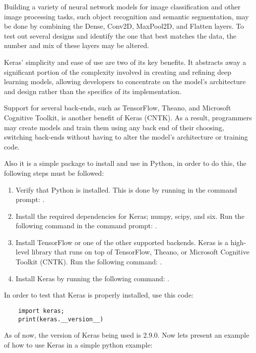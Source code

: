 Building a variety of neural network models for image classification and other image processing tasks, such object recognition and semantic segmentation, may be done by combining the Dense, Conv2D, MaxPool2D, and Flatten layers. To test out several designs and identify the one that best matches the data, the number and mix of these layers may be altered.

Keras' simplicity and ease of use are two of its key benefits. It abstracts away a significant portion of the complexity involved in creating and refining deep learning models, allowing developers to concentrate on the model's architecture and design rather than the specifics of its implementation.

Support for several back-ends, such as TensorFlow, Theano, and Microsoft Cognitive Toolkit, is another benefit of Keras (CNTK). As a result, programmers may create models and train them using any back end of their choosing, switching back-ends without having to alter the model's architecture or training code.

Also it is a simple package to install and use in Python, in order to do this, the following steps must be followed:
\begin{enumerate}
	\item Verify that Python is installed. This is done by running in the command prompt: .
	\item Install the required dependencies for Keras; numpy, scipy, and six. Run the following command in the command prompt: .
	\item Install TensorFlow or one of the other supported backends. Keras is a high-level library that runs on top of TensorFlow, Theano, or Microsoft Cognitive Toolkit (CNTK). Run the following command: .
	\item Install Keras by running the following command: .
\end{enumerate}

In order to test that Keras is properly installed, use this code: 
\begin{lstlisting}
	import keras; 
	print(keras.__version__)
\end{lstlisting}

As of now, the version of Keras being used is 2.9.0. Now lets present an example of how to use Keras in a simple python example:




